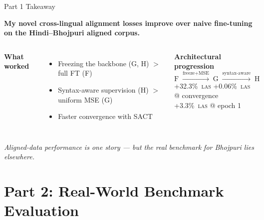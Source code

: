 \documentclass[aspectratio=169,10pt]{beamer}
\newcommand{\bho}{Bhojpuri}
\newcommand{\hi}{Hindi}
\newcommand{\las}{\textsc{las}}
\begin{document}
\begin{frame}{Part 1 Takeaway}
\vspace{0.5cm}
\begin{center}
\colorbox{comp1!15}{\parbox{0.85\textwidth}{\centering\large
\textbf{My novel cross-lingual alignment losses improve over naive fine-tuning on the \hi{}--\bho{} aligned corpus.}
}}
\end{center}

\vspace{0.7cm}
\begin{columns}[T]
\textbf{What worked}
\begin{itemize}
  \item Freezing the backbone (G, H) $>$ full FT (F)
  \item Syntax-aware supervision (H) $>$ uniform MSE (G)
  \item Faster convergence with SACT
\end{itemize}

\textbf{Architectural progression}
\[
\text{F}\;\xrightarrow{\text{freeze}+\text{MSE}}\;\text{G}\;\xrightarrow{\text{syntax-aware}}\;\text{H}
\]
\vspace{0.1cm}
+32.3\%~\las{} \hfill +0.06\%~\las{} @ convergence\\
\phantom{+32.3\%~\las{}} \hfill +3.3\%~\las{} @ epoch 1
\end{columns}

\vspace{0.6cm}
\centering
\small \textit{Aligned-data performance is one story --- but the real benchmark for \bho{} lies elsewhere.}
\end{frame}

\section{Part 2: Real-World Benchmark Evaluation}
\end{document}
